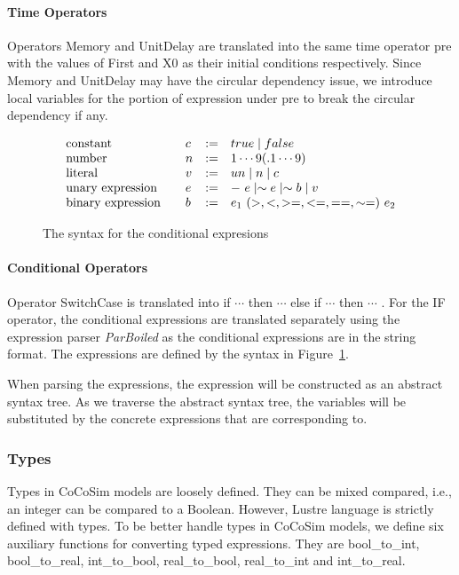 \documentclass{article}
\begin{document}
\paragraph{Time Operators}
Operators Memory and UnitDelay are translated into the same time operator \textsf{pre} with the 
values of First and X0 as their initial conditions respectively.
Since Memory and UnitDelay may have the circular dependency issue, we introduce local variables for the 
portion of expression under \textsf{pre} to break the circular dependency if any. 

\begin{figure}[t]
\[
\begin{array}{l@{\qquad}llll}
 \text{constant} & c & := & 
true \mid false
 \\[0ex]
 \text{number} & n & := & 
 1 \cdots 9 (.1 \cdots 9)
 \\[0ex]
  \text{literal} & v & := & 
u n \mid n \mid c
 \\[0ex]
\text{unary expression} & e & := & 
-\ e \mid \sim e \mid \sim b \mid v
 \\[0ex]
 \text{binary expression} & b & := & 
e_1\ (>, <, >=, <=, ==, \sim=)\ e_2 
 \\[0ex]
\end{array}       
\]
\caption{The syntax for the conditional expresions}
\label{fig:grammar}
\end{figure}

\paragraph{Conditional Operators}
Operator SwitchCase is translated into \textsf{if $\cdots$ then $\cdots$ else if $\cdots$ then $\cdots$ }. 
For the IF operator, the conditional expressions are translated separately using the
expression parser \emph{ParBoiled} as the conditional expressions are in the string format. 
The expressions are defined by the syntax in Figure~\ref{fig:grammar}.

When parsing the expressions, the expression will be constructed as an abstract syntax tree. 
As we traverse the abstract syntax tree, the variables will be substituted by the concrete expressions
that are corresponding to.

\subsubsection{Types}

Types in CoCoSim models are loosely defined. 
They can be mixed compared, i.e., an integer can be compared to a Boolean.
However, Lustre language is strictly defined with types.
To be better handle types in CoCoSim models, we define six auxiliary functions
for converting typed expressions.
They are \textsf{bool\_to\_int, bool\_to\_real, int\_to\_bool, 
real\_to\_bool, real\_to\_int} and \textsf{int\_to\_real}. 
\end{document}
